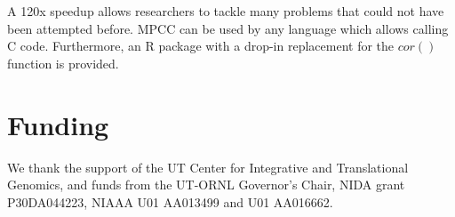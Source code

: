 \documentclass{bioinfo}
\begin{document}
A 120x speedup allows researchers to tackle many problems that could 
not have been attempted before. MPCC can be used by any language which 
allows calling C code. Furthermore, an R package with a drop-in 
replacement for the $cor()$ function is provided.
\vspace*{-5mm}
\section*{Funding}
We thank the support of the UT Center for Integrative and Translational Genomics, 
and funds from the UT-ORNL Governor's Chair, NIDA grant P30DA044223, NIAAA U01 
AA013499 and U01 AA016662.
\vspace*{-5mm}


\end{document}
